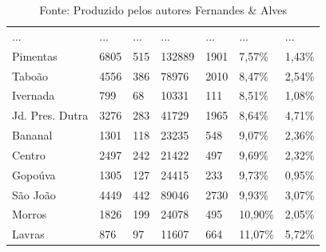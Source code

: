 \begin{spacing}{1}
\begin{table}[H]
\begin{tabular}{|p{3.3cm}p{1.5cm}p{1.5cm}p{1.5cm}p{1.5cm}p{1.5cm}p{1.5cm}|}
    ... & ... & ... & ... & ... & ... & ... \\
    Pimentas           & 6805 & 515 & 132889 & 1901 & 7,57\%  & 1,43\%  \\
    Taboão             & 4556 & 386 & 78976  & 2010 & 8,47\%  & 2,54\%  \\
    Ivernada           & 799  & 68  & 10331  & 111  & 8,51\%  & 1,08\%  \\
    Jd. Pres. Dutra    & 3276 & 283 & 41729  & 1965 & 8,64\%  & 4,71\%  \\
    Bananal            & 1301 & 118 & 23235  & 548  & 9,07\%  & 2,36\%  \\
    Centro             & 2497 & 242 & 21422  & 497  & 9,69\%  & 2,32\%  \\
    Gopoúva            & 1305 & 127 & 24415  & 233  & 9,73\%  & 0,95\%  \\
    São João           & 4449 & 442 & 89046  & 2730 & 9,93\%  & 3,07\%  \\
    Morros             & 1826 & 199 & 24078  & 495  & 10,90\% & 2,05\%  \\
    Lavras             & 876  & 97  & 11607  & 664  & 11,07\% & 5,72\%  \\ \hline
    \end{tabular}
    \caption*{Fonte: Produzido pelos autores Fernandes \& Alves}
    \label{tab:repass_bairros}
\end{table}
\end{spacing}

